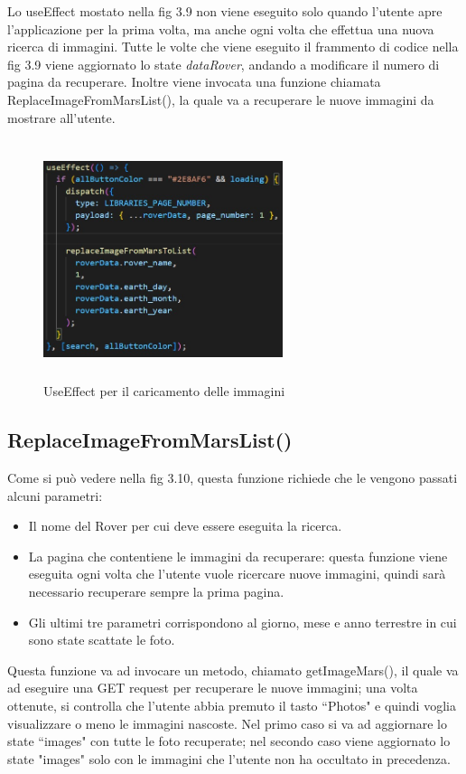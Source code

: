 Lo useEffect mostato nella fig 3.9 non viene eseguito solo quando l'utente apre l'applicazione per la prima volta, ma anche ogni volta che effettua una nuova ricerca di immagini.
Tutte le volte che viene eseguito il frammento di codice nella fig 3.9 viene aggiornato lo state \textit{dataRover}, andando a modificare il numero di pagina da recuperare. Inoltre viene invocata una funzione chiamata ReplaceImageFromMarsList{}(),
la quale va a recuperare le nuove immagini da mostrare all'utente.
\begin{figure}[h]
    \centering
    \includegraphics[width=7cm, height=7cm]{images/useEffect.jpg}
    \caption[differenzeiteot]{UseEffect per il caricamento delle immagini}
    \label{fig:useEffect}
\end{figure}
\subsection*{ReplaceImageFromMarsList()}
Come si pu\`o vedere nella fig 3.10, questa funzione richiede che le vengono passati alcuni parametri:
\begin{itemize}
    \item Il nome del Rover per cui deve essere eseguita la ricerca.
    \item La pagina che contentiene le immagini da recuperare: questa funzione viene eseguita ogni volta che l'utente vuole ricercare nuove immagini, quindi sar\`a necessario recuperare sempre la prima pagina.
    \item Gli ultimi tre parametri corrispondono al giorno, mese e anno terrestre in cui sono state scattate le foto.
\end{itemize}

Questa funzione va ad invocare un metodo, chiamato getImageMars(), il quale va ad eseguire una GET request per recuperare le nuove immagini; una volta ottenute, si controlla che l'utente abbia premuto il tasto ``Photos" e quindi voglia visualizzare o meno le immagini nascoste.
Nel primo caso si va ad aggiornare lo state ``images" con tutte le foto recuperate; nel secondo caso viene aggiornato lo state "images" solo con le immagini che l'utente non ha occultato in precedenza.

